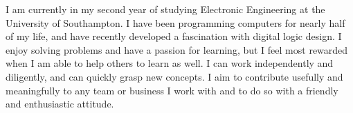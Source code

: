
I am currently in my second year of studying Electronic Engineering at the University of Southampton. I have been programming computers for nearly half of my life, and have recently developed a fascination with digital logic design. I enjoy solving problems and have a passion for learning, but I feel most rewarded when I am able to help others to learn as well. I can work independently and diligently, and can quickly grasp new concepts. I aim to contribute usefully and meaningfully to any team or business I work with and to do so with a friendly and enthusiastic attitude.

